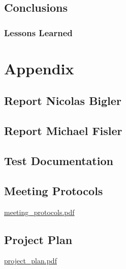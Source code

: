 \documentclass[a4paper]{scrartcl}
\begin{document}

\subsubsection{}
\subsection{Conclusions}

\subsubsection{Lessons Learned}

\section{Appendix}	

\subsection{Report Nicolas Bigler}

\subsection{Report Michael Fisler}

\subsection{Test Documentation}

\subsection{Meeting Protocols}
	\href{meeting\_protocols.pdf}{meeting\_protocols.pdf}

\subsection{Project Plan}
	\href{./project\_plan.pdf}{project\_plan.pdf}
\end{document}
